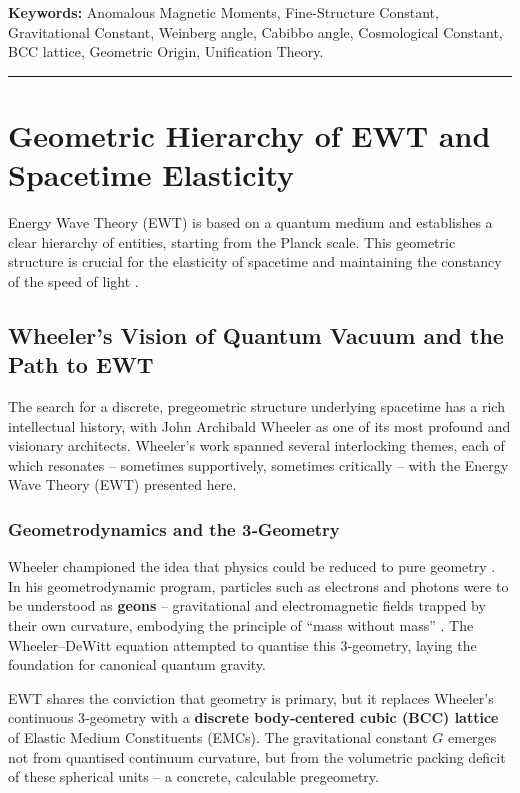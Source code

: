 \documentclass[10pt,a4paper]{article}
\begin{document}
\vspace{1em}
\noindent\textbf{Keywords:} Anomalous Magnetic Moments, Fine-Structure Constant, Gravitational Constant, Weinberg angle, Cabibbo angle, Cosmological Constant, BCC lattice, Geometric Origin, Unification Theory.

\tableofcontents\thispagestyle{plain}
\noindent\rule{\textwidth}{1pt}
\vspace{10pt}
\clearpage

\section{Geometric Hierarchy of EWT and Spacetime Elasticity}

Energy Wave Theory (EWT) is based on a quantum medium and establishes a clear hierarchy of entities, starting from the Planck scale. This geometric structure is crucial for the elasticity of spacetime and maintaining the constancy of the speed of light \cite{Yee2020Aether}.

\subsection{Wheeler's Vision of Quantum Vacuum and the Path to EWT}

The search for a discrete, pregeometric structure underlying spacetime 
has a rich intellectual history, with John Archibald Wheeler as one of 
its most profound and visionary architects. Wheeler's work spanned 
several interlocking themes, each of which resonates – sometimes 
supportively, sometimes critically – with the Energy Wave Theory 
(EWT) presented here.

\subsubsection*{Geometrodynamics and the 3‑Geometry}
Wheeler championed the idea that physics could be reduced to pure 
geometry \cite{Wheeler1962}. In his geometrodynamic program, 
particles such as electrons and photons were to be understood as 
\textbf{geons} – gravitational and electromagnetic fields trapped 
by their own curvature, embodying the principle of ``mass without 
mass'' \cite{MisnerThorneWheeler1973}. The Wheeler–DeWitt equation 
\cite{DeWitt1967} attempted to quantise this 3‑geometry, 
laying the foundation for canonical quantum gravity. 

EWT shares the conviction that geometry is primary, but it 
replaces Wheeler's continuous 3‑geometry with a \textbf{discrete 
	body‑centered cubic (BCC) lattice} of Elastic Medium Constituents 
(EMCs). The gravitational constant $G$ emerges not from quantised 
continuum curvature, but from the volumetric packing deficit of 
these spherical units – a concrete, calculable pregeometry.
\end{document}
